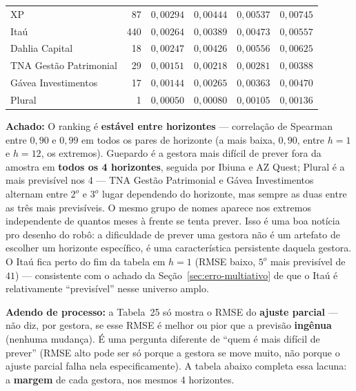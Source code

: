 \documentclass[11pt,a4paper]{article}
\newcommand{\aha}[1]{\par\vspace{4pt}\noindent\textbf{\color{vermelho}Achado:} #1\par\vspace{2pt}}
\begin{document}
\begin{center}
\begin{longtable}{@{}lrrrrr@{}}
XP & 87 & $0{,}00294$ & $0{,}00444$ & $0{,}00537$ & $0{,}00745$ \\
Itaú & 440 & $0{,}00264$ & $0{,}00389$ & $0{,}00473$ & $0{,}00557$ \\
Dahlia Capital & 18 & $0{,}00247$ & $0{,}00426$ & $0{,}00556$ & $0{,}00625$ \\
TNA Gestão Patrimonial & 29 & $0{,}00151$ & $0{,}00218$ & $0{,}00281$ & $0{,}00388$ \\
Gávea Investimentos & 17 & $0{,}00144$ & $0{,}00265$ & $0{,}00363$ & $0{,}00470$ \\
Plural & 1 & $0{,}00050$ & $0{,}00080$ & $0{,}00105$ & $0{,}00136$ \\
\end{longtable}
\end{center}

\aha{O ranking é \textbf{estável entre horizontes} --- correlação de Spearman entre $0{,}90$ e
$0{,}99$ em todos os pares de horizonte (a mais baixa, $0{,}90$, entre $h=1$ e $h=12$, os
extremos). Guepardo é a gestora mais difícil de prever fora da amostra em \textbf{todos os 4
horizontes}, seguida por Ibiuna e AZ Quest; Plural é a mais previsível nos 4 --- TNA Gestão
Patrimonial e Gávea Investimentos alternam entre $2^o$ e $3^o$ lugar dependendo do horizonte, mas
sempre as duas entre as três mais previsíveis. O mesmo grupo de nomes aparece nos extremos
independente de quantos meses à frente se tenta prever. Isso é uma boa notícia pro desenho do robô: a dificuldade de prever uma gestora não
é um artefato de escolher um horizonte específico, é uma característica persistente daquela
gestora. O Itaú fica perto do fim da tabela em $h=1$ (RMSE baixo, $5^o$ mais previsível de $41$)
--- consistente com o achado da Seção~\ref{sec:erro-multiativo} de que o Itaú é relativamente
``previsível'' nesse universo amplo.}

\textbf{Adendo de processo:} a Tabela~25 só mostra o RMSE do \textbf{ajuste parcial} --- não diz,
por gestora, se esse RMSE é melhor ou pior que a previsão \textbf{ingênua} (nenhuma mudança). É
uma pergunta diferente de ``quem é mais difícil de prever'' (RMSE alto pode ser só porque a
gestora se move muito, não porque o ajuste parcial falha nela especificamente). A tabela abaixo
completa essa lacuna: a \textbf{margem} de cada gestora, nos mesmos 4 horizontes.
\end{document}
